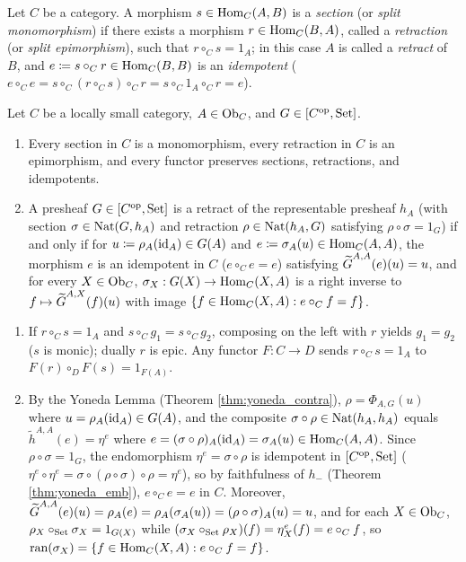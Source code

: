 \documentclass[10pt,a4paper]{article}
\begin{document}
\begin{definition}\label{def:retract}
Let $C$ be a category. A morphism $s \in {\textrm{Hom}}_C(A, B)$ is a \emph{section} (or \emph{split monomorphism}) if there exists a morphism $r \in {\textrm{Hom}}_C(B, A)$, called a \emph{retraction} (or \emph{split epimorphism}), such that $r \circ_C s = 1_A$; in this case $A$ is called a \emph{retract} of $B$, and $e \coloneqq s \circ_C r \in {\textrm{Hom}}_C(B, B)$ is an \emph{idempotent} ($e \circ_C e = s \circ_C (r \circ_C s) \circ_C r = s \circ_C 1_A \circ_C r = e$).
\end{definition}

\begin{theorem}\label{thm:retract_yoneda}
Let $C$ be a locally small category, $A \in {\textrm{Ob}}_C$, and $G \in [C^{\textrm{op}}, {\textrm{Set}}]$.
\begin{enumerate}
\item Every section in $C$ is a monomorphism, every retraction in $C$ is an epimorphism, and every functor preserves sections, retractions, and idempotents.
\item A presheaf $G \in [C^{\textrm{op}}, {\textrm{Set}}]$ is a retract of the representable presheaf $h_A$ (with section $\sigma \in {\textrm{Nat}}(G, h_A)$ and retraction $\rho \in {\textrm{Nat}}(h_A, G)$ satisfying $\rho \circ \sigma = 1_G$) if and only if for $u \coloneqq \rho_A({\textrm{id}}_A) \in G(A)$ and $e \coloneqq \sigma_A(u) \in {\textrm{Hom}}_C(A, A)$, the morphism $e$ is an idempotent in $C$ ($e \circ_C e = e$) satisfying ${\widetilde{G}\textrm{}}^{A,A}(e)(u) = u$, and for every $X \in {\textrm{Ob}}_C$, $\sigma_X : G(X) \to {\textrm{Hom}}_C(X, A)$ is a right inverse to $f \mapsto {\widetilde{G}\textrm{}}^{A,X}(f)(u)$ with image $\{f \in {\textrm{Hom}}_C(X, A) : e \circ_C f = f\}$.
\end{enumerate}
\end{theorem}
\myprf
\begin{enumerate}
\item If $r \circ_C s = 1_A$ and $s \circ_C g_1 = s \circ_C g_2$, composing on the left with $r$ yields $g_1 = g_2$ ($s$ is monic); dually $r$ is epic. Any functor $F : C \to D$ sends $r \circ_C s = 1_A$ to $F(r) \circ_D F(s) = 1_{F(A)}$.
\item By the Yoneda Lemma (Theorem \ref{thm:yoneda_contra}), $\rho = \Phi_{A,G}(u)$ where $u = \rho_A({\textrm{id}}_A) \in G(A)$, and the composite $\sigma \circ \rho \in {\textrm{Nat}}(h_A, h_A)$ equals $\widetilde{h}^{A,A}(e) = \eta^e$ where $e = (\sigma \circ \rho)_A({\textrm{id}}_A) = \sigma_A(u) \in {\textrm{Hom}}_C(A, A)$. Since $\rho \circ \sigma = 1_G$, the endomorphism $\eta^e = \sigma \circ \rho$ is idempotent in $[C^{\textrm{op}}, {\textrm{Set}}]$ ($\eta^e \circ \eta^e = \sigma \circ (\rho \circ \sigma) \circ \rho = \eta^e$), so by faithfulness of $h_-$ (Theorem \ref{thm:yoneda_emb}), $e \circ_C e = e$ in $C$. Moreover, ${\widetilde{G}\textrm{}}^{A,A}(e)(u) = \rho_A(e) = \rho_A(\sigma_A(u)) = (\rho \circ \sigma)_A(u) = u$, and for each $X \in {\textrm{Ob}}_C$, $\rho_X \circ_{\textrm{Set}} \sigma_X = 1_{G(X)}$ while $(\sigma_X \circ_{\textrm{Set}} \rho_X)(f) = \eta^e_X(f) = e \circ_C f$, so $\textrm{ran}(\sigma_X) = \{f \in {\textrm{Hom}}_C(X,A) : e \circ_C f = f\}$.
\end{enumerate}
\myqed
\end{document}
